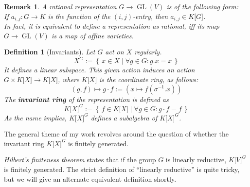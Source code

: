 \message{ !name(roughdraft.tex)}\documentclass{article}
\theoremstyle{prrt}
\newtheorem{definition}[theorem]{Definition}
\newtheorem{remark}{Remark}[theorem]
\begin{document}
\begin{remark}
  A rational representation $ G \longrightarrow \operatorname{GL}\left(V\right) $ is of the following form:\\
  If $ a_{i,j} : G \longrightarrow K $ is the function of the $\left( i,j \right) $-entry, then $ a_{i,j} \in K\lbrack G\rbrack $.\\
  In fact, it is equivalent to define a representation as rational, iff its map $ G \longrightarrow \operatorname{GL} \left( V \right) $ is a map of affine varieties.
\end{remark}

\begin{definition}[Invariants]
  Let $ G $ act on $ X $ regularly.
  \begin{equation}
    X^G := \left\{\, x \in X \mid \forall g \in G : g . x = x \,\right\}
  \end{equation}
  It defines a linear subspace.
  This given action induces an action $ G \times K\lbrack X\rbrack \longrightarrow K\lbrack X\rbrack $, where $K\lbrack X\rbrack$ is the coordinate ring, as follows:
  \begin{equation}
    \left( g , f \right) \longmapsto g \cdot f :=
    \left( x \mapsto f \left( \sigma^{-1} . x \right) \right)
  \end{equation}
  The \textbf{invariant ring} of the representation is defined as
  \begin{equation}
    K\lbrack X\rbrack^G := \left\{ \, f \in K\lbrack X \rbrack \mid \forall g \in G : g \cdot f = f \, \right\}
  \end{equation}
  As the name implies, $ K\lbrack X\rbrack^G $ defines a subalgebra of $ K\lbrack X\rbrack^G $.
\end{definition}

The general theme of my work revolves around the question of whether the invariant ring $ K\lbrack X\rbrack^G $ is finitely generated.

\textit{Hilbert's finiteness theorem} states that if the group $G$ is linearly reductive, $ K\lbrack V\rbrack^G $ is finitely generated.
The strict definition of ``linearly reductive'' is quite tricky, but we will give an alternate equivalent definition shortly.

\end{document}

